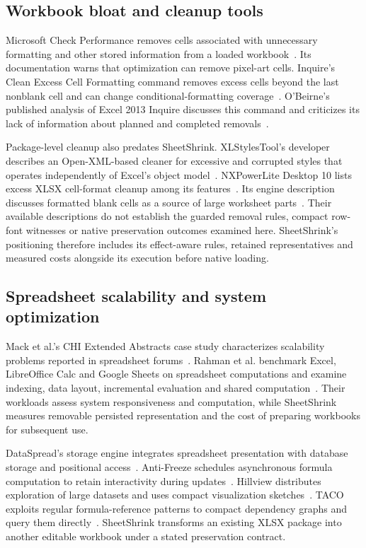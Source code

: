 \subsection{Workbook bloat and cleanup tools}
Microsoft Check Performance removes cells associated with unnecessary formatting
and other stored information from a loaded workbook~\cite{checkperformance}.
Its documentation warns that optimization can remove pixel-art cells. Inquire's
Clean Excess Cell Formatting command removes excess cells beyond the last
nonblank cell and can change conditional-formatting coverage~\cite{inquirecleanup}.
O'Beirne's published analysis of Excel 2013 Inquire discusses this command and
criticizes its lack of information about planned and completed
removals~\cite{obeirne2013inquire}.

Package-level cleanup also predates SheetShrink. XLStylesTool's developer
describes an Open-XML-based cleaner for excessive and corrupted styles that
operates independently of Excel's object model~\cite{xlstylestool}.
NXPowerLite Desktop 10 lists excess XLSX cell-format cleanup among its
features~\cite{nxpowerlite10}. Its engine description discusses formatted blank
cells as a source of large worksheet parts~\cite{nxengine}. Their available
descriptions do not establish the
guarded removal rules, compact row-font witnesses or native preservation
outcomes examined here. SheetShrink's positioning therefore includes its
effect-aware rules, retained
representatives and measured costs alongside its execution before native loading.

\subsection{Spreadsheet scalability and system optimization}
Mack et al.'s CHI Extended Abstracts case study characterizes scalability
problems reported in spreadsheet forums~\cite{mack2018scalability}. Rahman et al.
benchmark Excel, LibreOffice Calc and Google Sheets on spreadsheet computations
and examine indexing, data layout, incremental evaluation and shared
computation~\cite{rahman2020benchmarking}. Their workloads assess system
responsiveness and
computation, while SheetShrink measures removable persisted representation and
the cost of preparing workbooks for subsequent use.

DataSpread's storage engine integrates spreadsheet presentation with database
storage and positional access~\cite{bendre2018pdm}. Anti-Freeze schedules
asynchronous formula computation to retain interactivity during
updates~\cite{bendre2019antifreeze}. Hillview distributes exploration of large
datasets and uses compact visualization sketches~\cite{budiu2019hillview}.
TACO exploits regular formula-reference patterns to compact dependency graphs
and query them directly~\cite{tang2023taco}. SheetShrink transforms
an existing XLSX package into another editable workbook under a stated
preservation contract.

